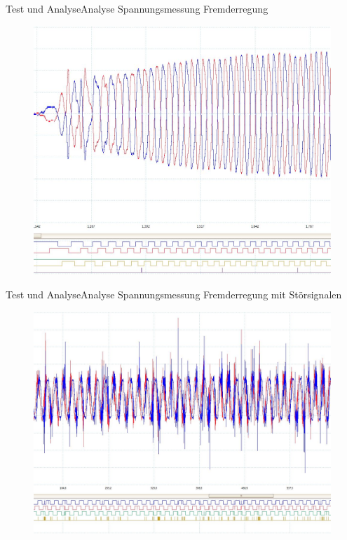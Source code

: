 \begin{frame}{Test und Analyse}{Analyse Spannungsmessung Fremderregung}
	\begin{figure}
		\includegraphics[height=\textheight]{Test/Spannungssignal_Messung}
	\end{figure}
\end{frame}

\begin{frame}{Test und Analyse}{Analyse Spannungsmessung Fremderregung mit Störsignalen}
	\begin{figure}
		\includegraphics[width=\textwidth]{Test/Spannungssignal_Messung_mit_Fehler}
	\end{figure}
\end{frame}

